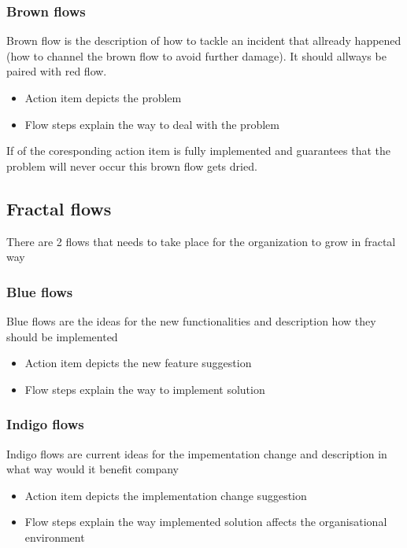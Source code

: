 \documentclass[12pt,a4paper,twoside]{article}
\begin{document}
\subsubsection{Brown flows}\label{philo:brown:flow}
Brown flow is the description of how to tackle an incident that allready happened (how to channel the brown flow to avoid further damage). It should allways be paired with red flow.
\begin{itemize}
  \item Action item depicts the problem 
  \item Flow steps explain the way to deal with the problem
\end{itemize}
If  of the coresponding action item is fully implemented and guarantees that the problem will never occur this brown flow gets dried.
\subsection{Fractal flows}
There are 2 flows that needs to take place for the organization to grow in fractal way
\subsubsection{Blue flows}\label{philo:blue:flow}
Blue flows are the ideas for the new functionalities and description how they should be implemented
\begin{itemize}
  \item Action item depicts the new feature suggestion 
  \item Flow steps explain the way to implement solution
\end{itemize}
\subsubsection{Indigo flows}\label{philo:indigo:flow}
Indigo flows are current ideas for the impementation change and description in what way would it benefit company
\begin{itemize}
  \item Action item depicts the implementation change suggestion 
  \item Flow steps explain the way implemented solution affects the organisational environment
\end{itemize}
\end{document}
